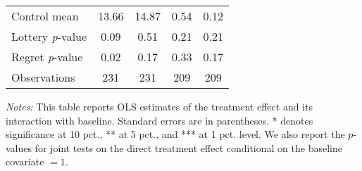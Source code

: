 \begin{table}[ht]
{\begin{threeparttable}
\begin{tabular}{l*{4}{c}}
Control mean    &    13.66         &    14.87         &     0.54         &     0.12         \\
Lottery \emph{p}-value&     0.09         &     0.51         &     0.21         &     0.21         \\
Regret \emph{p}-value&     0.02         &     0.17         &     0.33         &     0.17         \\
Observations    &      231         &      231         &      209         &      209         \\
\bottomrule \end{tabular} \begin{tablenotes}[flushleft] \footnotesize \item \emph{Notes:} This table reports OLS estimates of the treatment effect and its interaction with baseline. Standard errors are in parentheses. * denotes significance at 10 pct., ** at 5 pct., and *** at 1 pct. level. We also report the \(p\)-values for joint tests on the direct treatment effect conditional on the baseline covariate $= 1$. \end{tablenotes} \end{threeparttable} } \end{table}

